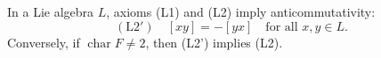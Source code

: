 In a Lie algebra $L$, axioms (L1) and (L2) imply anticommutativity:
$$(\text{L}2') \quad [xy] = -[yx] \quad \text{for all } x, y \in L.$$
Conversely, if $\operatorname{char} F \neq 2$, then (L2') implies (L2).
